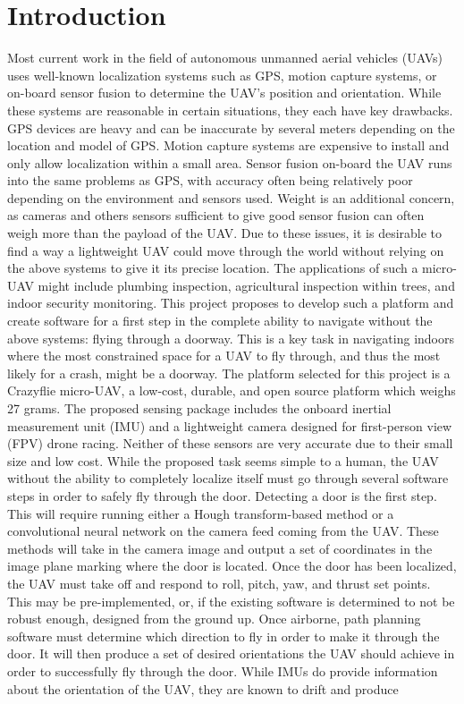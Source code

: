\documentclass[12pt]{article}
\begin{document}
\listoffigures

\section{Introduction}
Most current work in the field of autonomous unmanned aerial vehicles (UAVs) uses well-known localization systems such as GPS, motion capture systems, or on-board sensor fusion to determine the UAV's position and orientation. While these systems are reasonable in certain situations, they each have key drawbacks. GPS devices are heavy and can be inaccurate by several meters depending on the location and model of GPS. Motion capture systems are expensive to install and only allow localization within a small area. Sensor fusion on-board the UAV runs into the same problems as GPS, with accuracy often being relatively poor depending on the environment and sensors used. Weight is an additional concern, as cameras and others sensors sufficient to give good sensor fusion can often weigh more than the payload of the UAV. Due to these issues, it is desirable to find a way a lightweight UAV could move through the world without relying on the above systems to give it its precise location. The applications of such a micro-UAV might include plumbing inspection, agricultural inspection within trees, and indoor security monitoring. This project proposes to develop such a platform and create software for a first step in the complete ability to navigate without the above systems: flying through a doorway. This is a key task in navigating indoors where the most constrained space for a UAV to fly through, and thus the most likely for a crash, might be a doorway. The platform selected for this project is a Crazyflie micro-UAV, a low-cost, durable, and open source platform which weighs 27 grams. The proposed sensing package includes the onboard inertial measurement unit (IMU) and a lightweight camera designed for first-person view (FPV) drone racing. Neither of these sensors are very accurate due to their small size and low cost. While the proposed task seems simple to a human, the UAV without the ability to completely localize itself must go through several software steps in order to safely fly through the door. Detecting a door is the first step. This will require running either a Hough transform-based method or a convolutional neural network on the camera feed coming from the UAV. These methods will take in the camera image and output a set of coordinates in the image plane marking where the door is located. Once the door has been localized, the UAV must take off and respond to roll, pitch, yaw, and thrust set points. This may be pre-implemented, or, if the existing software is determined to not be robust enough, designed from the ground up. Once airborne, path planning software must determine which direction to fly in order to make it through the door. It will then produce a set of desired orientations the UAV should achieve in order to successfully fly through the door. While IMUs do provide information about the orientation of the UAV, they are known to drift and produce 
\end{document}
